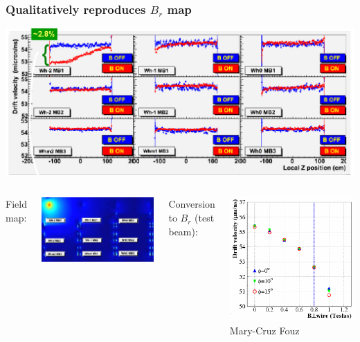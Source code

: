 \documentclass[compress]{beamer}
\begin{document}
\begin{frame}
\frametitle{Qualitatively reproduces $B_r$ map}

\includegraphics[width=0.95\linewidth]{cruz_analysis2.png}

\vfill
\begin{columns}
Field map:

\vspace{0.2 cm}
\includegraphics[width=\linewidth]{Br_simulation.png}


Conversion to $B_r$ (test beam):

\includegraphics[width=0.65\linewidth]{cruz_analysis3.png} \hfill {\tiny Mary-Cruz Fouz}
\end{columns}
\end{frame}
\end{document}
